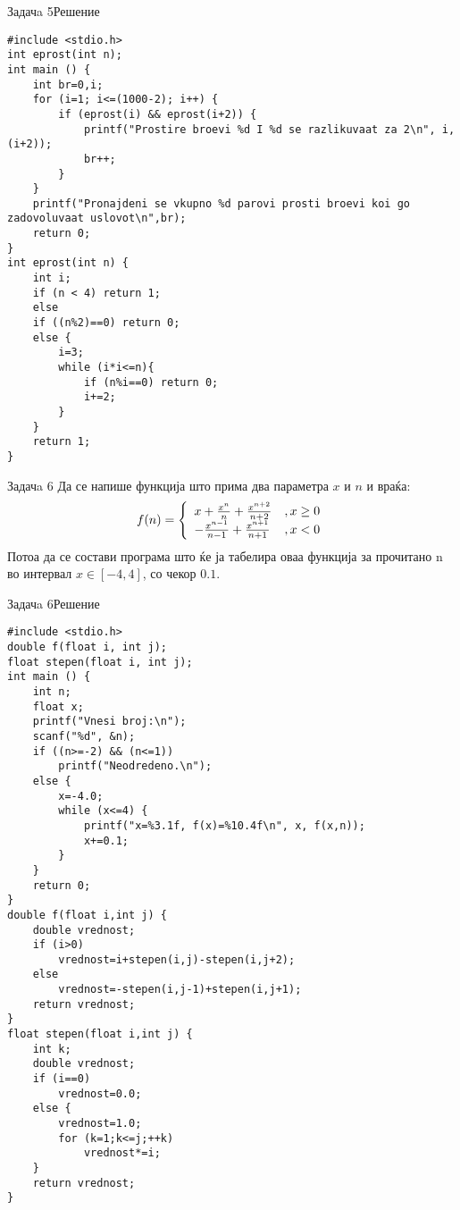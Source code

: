 \begin{frame}[fragile,shrink=10]{Задачa 5}{Решение}
\begin{lstlisting}
#include <stdio.h>
int eprost(int n);
int main () {
    int br=0,i;
    for (i=1; i<=(1000-2); i++) {
        if (eprost(i) && eprost(i+2)) {
            printf("Prostire broevi %d I %d se razlikuvaat za 2\n", i, (i+2));
            br++;
        }
    }
    printf("Pronajdeni se vkupno %d parovi prosti broevi koi go zadovoluvaat uslovot\n",br);
    return 0;
}
int eprost(int n) {
    int i;
    if (n < 4) return 1;
    else
    if ((n%2)==0) return 0;
    else {
        i=3;
        while (i*i<=n){
            if (n%i==0) return 0;
            i+=2;
        }
    }
    return 1;
} 
\end{lstlisting}
\end{frame}


\begin{frame}{Задачa 6}
Да се напише функција што прима два параметра $x$ и $n$ и враќа:
\[
   f(n) = \left\{ 
  \begin{array}{l l}
    x + \frac{x^n}{n} + \frac{x^{n+2}}{n + 2} & ,x\geq0\\
    - \frac{x^{n - 1}}{n - 1} + \frac{x^{n+1}}{n + 1} & ,x<0\\
  \end{array} \right.
\]
Потоа да се состави програма што ќе ја табелира оваа функција за прочитано n во
интервал $x\in[-4, 4]$, со чекор $0.1$.
\end{frame}

\begin{frame}[fragile,shrink=10]{Задачa 6}{Решение}
\begin{lstlisting}
#include <stdio.h>
double f(float i, int j);
float stepen(float i, int j);
int main () {
    int n;
    float x;
    printf("Vnesi broj:\n");
    scanf("%d", &n);
    if ((n>=-2) && (n<=1))
        printf("Neodredeno.\n");
    else {
        x=-4.0;
        while (x<=4) {
            printf("x=%3.1f, f(x)=%10.4f\n", x, f(x,n));
            x+=0.1;
        }
    }
    return 0;
}
double f(float i,int j) {
    double vrednost;
    if (i>0)
        vrednost=i+stepen(i,j)-stepen(i,j+2);
    else
        vrednost=-stepen(i,j-1)+stepen(i,j+1);
    return vrednost;
}
float stepen(float i,int j) {
    int k;
    double vrednost;
    if (i==0)
        vrednost=0.0;
    else {
        vrednost=1.0;
        for (k=1;k<=j;++k)
            vrednost*=i;
    }
    return vrednost;
}
\end{lstlisting}
\end{frame}

